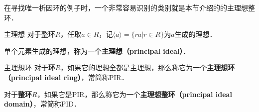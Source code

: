 

在寻找唯一析因环的例子时，一个非常容易识别的类别就是本节介绍的的主理想整环．

\begin{definition}{主理想}
对于整环$R$，任取$a\in R$，记$\langle a \rangle=\{ra|r\in R\}$为$a$生成的理想．

单个元素生成的理想，称为一个\textbf{主理想（principal ideal）}．
\end{definition}

\begin{definition}{主理想环}
对于\textbf{环}$R$，如果它的理想全都是主理想，那么称它为一个\textbf{主理想环（principal ideal ring）}，常简称PIR．

对于\textbf{整环}$R$，如果它是PIR，那么称它为一个\textbf{主理想整环（principal ideal domain）}，常简称PID．
\end{definition}







